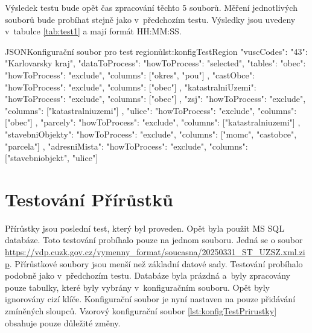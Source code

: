 Výsledek testu bude opět čas zpracování těchto 5 souborů.
Měření jednotlivých souborů bude probíhat stejně jako v~předchozím testu.
Výsledky jsou uvedeny v~tabulce \ref{tab:test1} a mají formát HH:MM:SS.

\newpage

\begin{code}{JSON}{Konfigurační soubor pro test regionů}{lst:konfigTestRegion}
  {
    "vuscCodes": {"43": "Karlovarsky kraj"},
    "dataToProcess": {
      "howToProcess": "selected",
      "tables": {
        "obec": {
          "howToProcess": "exclude",
          "columns": ["okres", "pou"]
        },
        "castObce": {
          "howToProcess": "exclude",
          "columns": ["obec"]
        },
        "katastralniUzemi": {
          "howToProcess": "exclude",
          "columns": ["obec"]
        },
        "zsj": {
          "howToProcess": "exclude",
          "columns": ["katastralniuzemi"]
        },
        "ulice": {
          "howToProcess": "exclude",
          "columns": ["obec"]
        },
        "parcely": {
          "howToProcess": "exclude",
          "columns": ["katastralniuzemi"]
        },
        "stavebniObjekty": {
          "howToProcess": "exclude",
          "columns": ["momc", "castobce", "parcela"]
        },
        "adresniMista": {
          "howToProcess": "exclude",
          "columns": ["stavebniobjekt", "ulice"]
        }
      }
    }
  }
\end{code}


\section{Testování Přírůstků}
Přírůstky jsou poslední test, který byl proveden.
Opět byla použit MS SQL databáze. Toto testování probíhalo pouze na jednom souboru.
Jedná se o soubor \url{https://vdp.cuzk.gov.cz/vymenny_format/soucasna/20250331_ST_UZSZ.xml.zip}. %
Přírůstkové soubory jsou menší než základní datové sady.
Testování probíhalo podobně jako v~předchozím testu.
Databáze byla prázdná a~byly zpracovány pouze tabulky, které byly vybrány v~konfiguračním souboru.
Opět byly ignorovány cizí klíče. Konfigurační soubor je nyní nastaven na pouze přidávání zmíněných sloupců.
Vzorový konfigurační soubor \ref{lst:konfigTestPrirustky} obsahuje pouze důležité změny.

